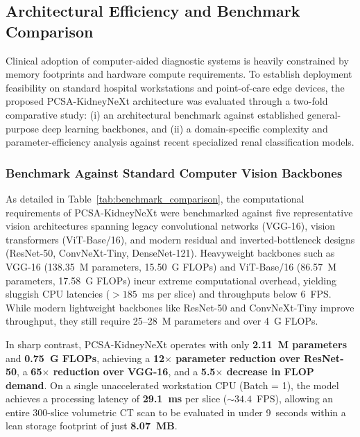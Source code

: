\documentclass[]{elsarticle}
\begin{document}
\subsection{Architectural Efficiency and Benchmark Comparison}
Clinical adoption of computer-aided diagnostic systems is heavily constrained by memory footprints and hardware compute requirements. To establish deployment feasibility on standard hospital workstations and point-of-care edge devices, the proposed PCSA-KidneyNeXt architecture was evaluated through a two-fold comparative study: (i) an architectural benchmark against established general-purpose deep learning backbones, and (ii) a domain-specific complexity and parameter-efficiency analysis against recent specialized renal classification models.

\subsubsection{Benchmark Against Standard Computer Vision Backbones}
As detailed in Table~\ref{tab:benchmark_comparison}, the computational requirements of PCSA-KidneyNeXt were benchmarked against five representative vision architectures spanning legacy convolutional networks (VGG-16), vision transformers (ViT-Base/16), and modern residual and inverted-bottleneck designs (ResNet-50, ConvNeXt-Tiny, DenseNet-121). Heavyweight backbones such as VGG-16 (138.35~M parameters, 15.50~G FLOPs) and ViT-Base/16 (86.57~M parameters, 17.58~G FLOPs) incur extreme computational overhead, yielding sluggish CPU latencies ($>185$~ms per slice) and throughputs below 6~FPS. While modern lightweight backbones like ResNet-50 and ConvNeXt-Tiny improve throughput, they still require 25--28~M parameters and over 4~G FLOPs.

In sharp contrast, PCSA-KidneyNeXt operates with only \textbf{2.11~M parameters} and \textbf{0.75~G FLOPs}, achieving a \textbf{12$\times$ parameter reduction over ResNet-50}, a \textbf{65$\times$ reduction over VGG-16}, and a \textbf{5.5$\times$ decrease in FLOP demand}. On a single unaccelerated workstation CPU (Batch = 1), the model achieves a processing latency of \textbf{29.1~ms} per slice ($\sim 34.4$~FPS), allowing an entire 300-slice volumetric CT scan to be evaluated in under 9~seconds within a lean storage footprint of just \textbf{8.07~MB}.
\end{document}
